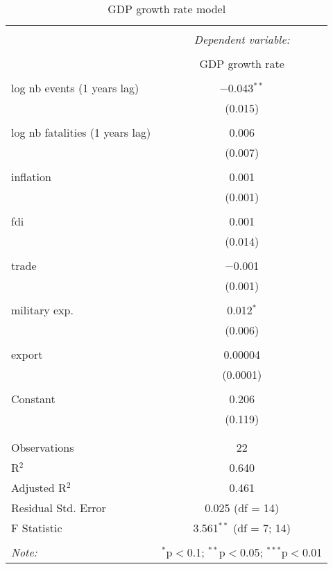 
\begin{table}[!htbp] \centering 
  \caption{GDP growth rate model} 
  \label{} 
\begin{tabular}{@{\extracolsep{5pt}}lc} 
\\[-1.8ex]\hline 
\hline \\[-1.8ex] 
 & \multicolumn{1}{c}{\textit{Dependent variable:}} \\ 
\cline{2-2} 
\\[-1.8ex] & GDP growth rate \\ 
\hline \\[-1.8ex] 
 log nb events (1 years lag) & $-$0.043$^{**}$ \\ 
  & (0.015) \\ 
  & \\ 
 log nb fatalities (1 years lag) & 0.006 \\ 
  & (0.007) \\ 
  & \\ 
 inflation & 0.001 \\ 
  & (0.001) \\ 
  & \\ 
 fdi & 0.001 \\ 
  & (0.014) \\ 
  & \\ 
 trade & $-$0.001 \\ 
  & (0.001) \\ 
  & \\ 
 military exp. & 0.012$^{*}$ \\ 
  & (0.006) \\ 
  & \\ 
 export & 0.00004 \\ 
  & (0.0001) \\ 
  & \\ 
 Constant & 0.206 \\ 
  & (0.119) \\ 
  & \\ 
\hline \\[-1.8ex] 
Observations & 22 \\ 
R$^{2}$ & 0.640 \\ 
Adjusted R$^{2}$ & 0.461 \\ 
Residual Std. Error & 0.025 (df = 14) \\ 
F Statistic & 3.561$^{**}$ (df = 7; 14) \\ 
\hline 
\hline \\[-1.8ex] 
\textit{Note:}  & \multicolumn{1}{r}{$^{*}$p$<$0.1; $^{**}$p$<$0.05; $^{***}$p$<$0.01} \\ 
\end{tabular} 
\end{table} 
